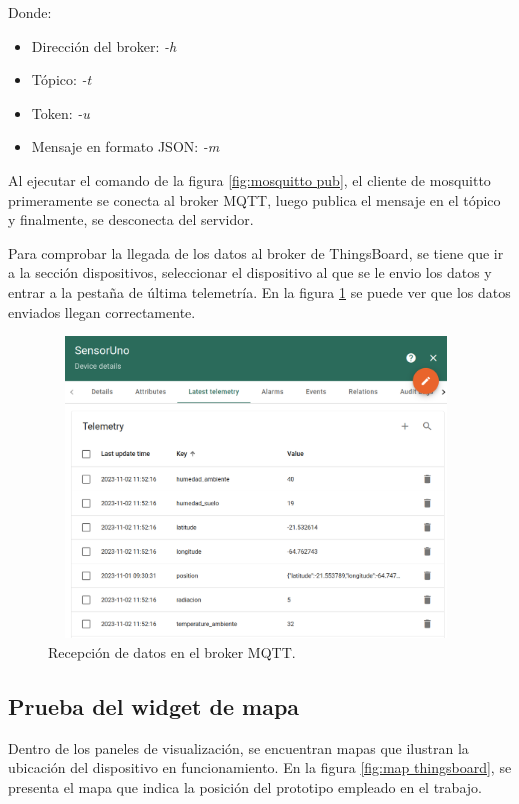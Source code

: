 Donde:
\begin{itemize}
  \item Dirección del broker: \textit{-h}
  \item Tópico: \textit{-t}  
  \item Token: \textit{-u}
  \item Mensaje en formato JSON: \textit{-m}
\end{itemize}

Al ejecutar el comando de la figura \ref{fig:mosquitto pub}, el cliente de mosquitto primeramente se conecta al broker MQTT, luego publica el mensaje en el tópico y finalmente, se desconecta del servidor.

Para comprobar la llegada de los datos al broker de ThingsBoard, se tiene que ir a la sección dispositivos, seleccionar el dispositivo al que se le envio los datos y entrar a la pestaña de última telemetría. En la figura \ref{fig:tb recepcion} se puede ver que los datos enviados llegan correctamente.

\begin{figure}[h!]
  \centering
    \includegraphics[width=11cm, height=8cm]{./Figures/tb_recepcion2.png}
  \caption{Recepción de datos en el broker MQTT.}
    \label{fig:tb recepcion}
\end{figure}

\subsection{Prueba del widget de mapa}
Dentro de los paneles de visualización, se encuentran mapas que ilustran la ubicación del dispositivo en funcionamiento. En la figura \ref{fig:map thingsboard}, se presenta el mapa que indica la posición del prototipo empleado en el trabajo.

